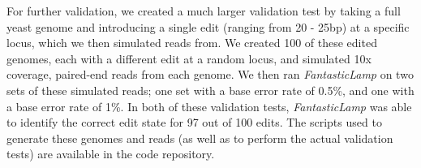 \documentclass{bioinfo}
\theoremstyle{definition}
\begin{document}
For further validation, we created a much larger validation test by taking a full yeast genome \citep{ncbis288c2023} and introducing a single edit (ranging from 20 - 25bp) at a specific locus, which we then simulated reads from.
We created 100 of these edited genomes, each with a different edit at a random locus, and simulated 10x coverage, paired-end reads from each genome.
We then ran \textit{FantasticLamp} on two sets of these simulated reads; one set with a base error rate of 0.5\%, and one with a base error rate of 1\%.
In both of these validation tests, \textit{FantasticLamp} was able to identify the correct edit state for 97 out of 100 edits.
The scripts used to generate these genomes and reads (as well as to perform the actual validation tests) are available in the code repository.


%
\end{document}
